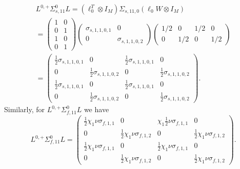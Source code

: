 \begin{multline*}
	L^{0,+}  \Sigma_{s,11}^{0} L = (\ell_{0}^{T} \otimes I_{M})\Sigma_{s,11,0} (\ell_{0} W \otimes I_{M}) \\ = 
	\begin{pmatrix}
		1 & 0 \\
		0 & 1 \\
		1 & 0 \\
		0 & 1
	\end{pmatrix}
	\begin{pmatrix}
		\sigma_{s,1,1,0,1} & 0 \\
		0 & \sigma_{s,1,1,0,2}
	\end{pmatrix}
	\begin{pmatrix}
		1/2 & 0 & 1/2 & 0 \\
		0 & 1/2 & 0 & 1/2
	\end{pmatrix} \\ =
	\begin{pmatrix}
		\frac{1}{2} \sigma_{s,1,1,0,1} & 0 & \frac{1}{2} \sigma_{s,1,1,0,1} & 0 \\
		0 & \frac{1}{2} \sigma_{s,1,1,0,2} & 0 & \frac{1}{2} \sigma_{s,1,1,0,2}  \\
		\frac{1}{2} \sigma_{s,1,1,0,1} & 0 & \frac{1}{2} \sigma_{s,1,1,0,1} & 0 \\
		0 & \frac{1}{2} \sigma_{s,1,1,0,2} & 0 & \frac{1}{2} \sigma_{s,1,1,0,2}
	\end{pmatrix}.
\end{multline*}
Similarly, for $L^{0,+}  \Sigma_{f,11}^{0} L$ we have
\begin{equation*}
L^{0,+}  \Sigma_{f,11}^{0} L = 
		\begin{pmatrix}
			\frac{1}{2} \chi_{1}\nu\sigma_{f,1,1} & 0 & \chi_{1}\frac{1}{2} \nu\sigma_{f,1,1} & 0 \\
			0 & \frac{1}{2} \chi_{1}\nu\sigma_{f,1,2} & 0 & \frac{1}{2} \chi_{1}\nu\sigma_{f,1,2}  \\
			\frac{1}{2} \chi_{1}\nu\sigma_{f,1,1} & 0 & \frac{1}{2} \chi_{1}\nu\sigma_{f,1,1} & 0 \\
			0 & \frac{1}{2} \chi_{1}\nu\sigma_{f,1,2} & 0 & \frac{1}{2}\chi_{1} \nu\sigma_{f,1,2}
	\end{pmatrix}.
\end{equation*}


